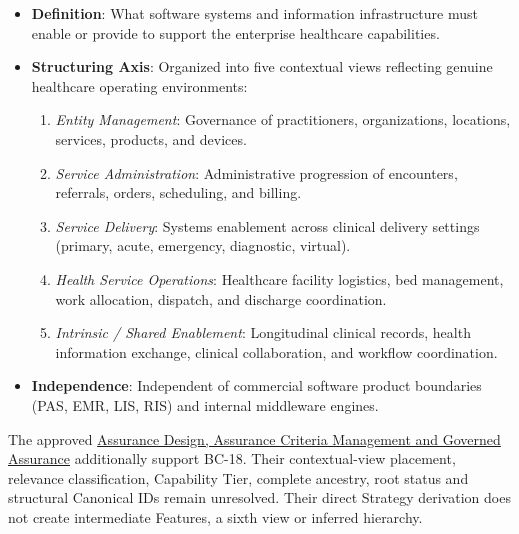 \begin{itemize}

\item
\textbf{Definition}: What software systems and information infrastructure must enable or provide to support the enterprise healthcare capabilities.



\item
\textbf{Structuring Axis}: Organized into five contextual views reflecting genuine healthcare operating environments:


\begin{enumerate}

\item
\emph{Entity Management}: Governance of practitioners, organizations, locations, services, products, and devices.



\item
\emph{Service Administration}: Administrative progression of encounters, referrals, orders, scheduling, and billing.



\item
\emph{Service Delivery}: Systems enablement across clinical delivery settings (primary, acute, emergency, diagnostic, virtual).



\item
\emph{Health Service Operations}: Healthcare facility logistics, bed management, work allocation, dispatch, and discharge coordination.



\item
\emph{Intrinsic /\allowbreak{} Shared Enablement}: Longitudinal clinical records, health information exchange, clinical collaboration, and workflow coordination.



\end{enumerate}


\item
\textbf{Independence}: Independent of commercial software product boundaries (PAS, EMR, LIS, RIS) and internal middleware engines.



\end{itemize}
\label{rad:tier-model:118}

The approved \hyperref[rad:enabling:674]{Assurance Design, Assurance Criteria Management and Governed Assurance} additionally support BC-18. Their contextual-view placement, relevance classification, Capability Tier, complete ancestry, root status and structural Canonical IDs remain unresolved. Their direct Strategy derivation does not create intermediate Features, a sixth view or inferred hierarchy.

